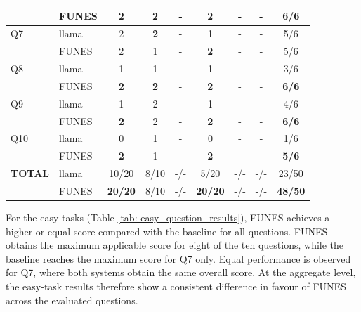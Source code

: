 \begin{table}[htbp]
\begin{tabular}{llccccccc}
   & FUNES & \textbf{2} & 2 & - & \textbf{2} & - & - & \textbf{6/6} \\
\hline
Q7 & llama & 2 & \textbf{2} & - & 1 & - & - & 5/6 \\
   & FUNES & 2 & 1 & - & \textbf{2} & - & - & 5/6 \\
\hline
Q8 & llama & 1 & 1 & - & 1 & - & - & 3/6 \\
   & FUNES & \textbf{2} & \textbf{2} & - & \textbf{2} & - & - & \textbf{6/6} \\
\hline
Q9 & llama & 1 & 2 & - & 1 & - & - & 4/6 \\
   & FUNES & \textbf{2} & 2 & - & \textbf{2} & - & - & \textbf{6/6} \\
\hline
Q10 & llama & 0 & 1 & - & 0 & - & - & 1/6 \\
    & FUNES & \textbf{2} & 1 & - & \textbf{2} & - & - & \textbf{5/6} \\
\midrule
\midrule
\textbf{TOTAL} & llama & 10/20 & 8/10 & -/- & 5/20 & -/- & -/- & 23/50 \\
                & FUNES & \textbf{20/20} & 8/10 & -/- & \textbf{20/20} & -/- & -/- & \textbf{48/50} \\
\bottomrule
\end{tabular}
\end{table}

For the easy tasks (Table \ref{tab: easy_question_results}), FUNES achieves a higher or equal score compared with the baseline for all questions. FUNES obtains the maximum applicable score for eight of the ten questions, while the baseline reaches the maximum score for Q7 only. Equal performance is observed for Q7, where both systems obtain the same overall score. At the aggregate level, the easy-task results therefore show a consistent difference in favour of FUNES across the evaluated questions.






